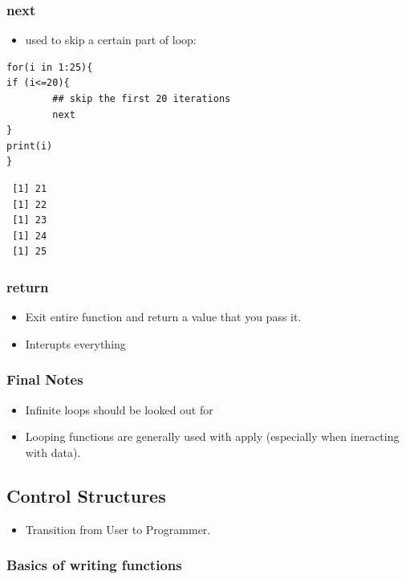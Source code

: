 \documentclass[11pt]{article}
\begin{document}
\subsubsection{next}
\label{sec-2-1-5}

\begin{itemize}
\item used to skip a certain part of loop:
\end{itemize}

\begin{verbatim}
for(i in 1:25){
if (i<=20){
        ## skip the first 20 iterations
        next
}
print(i)
}
\end{verbatim}

\begin{verbatim}
 [1] 21
 [1] 22
 [1] 23
 [1] 24
 [1] 25
\end{verbatim}
\subsubsection{return}
\label{sec-2-1-6}

\begin{itemize}
\item Exit entire function and return a value that you pass it.
\item Interupts everything
\end{itemize}
\subsubsection{Final Notes}
\label{sec-2-1-7}

\begin{itemize}
\item Infinite loops should be looked out for
\item Looping functions are generally used with apply (especially when
  ineracting with data).
\end{itemize}
\subsection{Control Structures}
\label{sec-2-2}

\begin{itemize}
\item Transition from User to Programmer.
\end{itemize}
\subsubsection{Basics of writing functions}
\label{sec-2-2-1}
\end{document}
